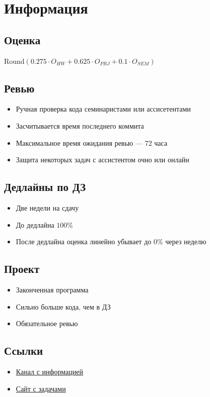 \section{Информация}

\subsection{Оценка}
Round\( (0.275 \cdot O_{HW} + 0.625 \cdot O_{PRJ} + 0.1 \cdot O_{SEM}) \)

\subsection{Ревью}
\begin{itemize}
    \item Ручная проверка кода семинаристами или ассисетентами
    \item Засчитывается время последнего коммита
    \item Максимальное время ожидания ревью --- 72 часа
    \item Защита некоторых задач с ассистентом очно или онлайн
\end{itemize}

\subsection{Дедлайны по ДЗ}
\begin{itemize}
    \item Две недели на сдачу
    \item До дедлайна \( 100 \)\% 
    \item После дедлайна оценка линейно убывает до \( 0 \)\% через неделю
\end{itemize}

\subsection{Проект}
\begin{itemize}
    \item Законченная программа
    \item Сильно больше кода, чем в ДЗ
    \item Обязательное ревью
\end{itemize}

\subsection{Ссылки}
\begin{itemize}
    \item \href{https://t.me/hse_cxx_pilot_2025}{Канал с информацией}
    \item \href{https://base.cpp-hse.net}{Сайт с задачами}
\end{itemize}
